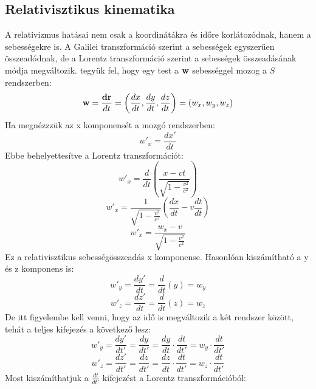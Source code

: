 \documentclass[a4paper,12pt]{article}
\begin{document}
\subsection{Relativisztikus kinematika}
A relativizmus hatásai nem csak a koordinátákra és időre korlátozódnak, hanem a sebességekre is. A Galilei transzformáció szerint a sebességek egyszerűen összeadódnak, de a Lorentz transzformáció szerint a sebességek összeadásának módja megváltozik.
tegyük fel, hogy egy test a $\bold{w}$ sebességgel mozog a $S$ rendszerben:
\begin{equation}
    \bold{w} = \frac{\bold{dr}}{dt} = \left(\frac{dx}{dt}, \frac{dy}{dt}, \frac{dz}{dt}\right) = (w_x, w_y, w_z)
\end{equation}
Ha megnézzzük az x komponensét a mozgó rendszerben:
\begin{equation}
    w'_x = \frac{dx'}{dt}
\end{equation}
Ebbe behelyettesítve a Lorentz transzformációt:
\begin{equation}
    w'_x = \frac{d}{dt} \left(\frac{x - vt}{\sqrt{1 - \frac{v^2}{c^2}}}\right)
\end{equation}
\begin{equation}
    w'_x = \frac{1}{\sqrt{1 - \frac{v^2}{c^2}}} \left(\frac{dx}{dt} - v\frac{dt}{dt}\right)
\end{equation}
\begin{equation}
    w'_x = \frac{w_x - v}{\sqrt{1 - \frac{v^2}{c^2}}}
\end{equation}
Ez a relativisztikus sebességösszeadás x komponense. Hasonlóan kiszámítható a y és z komponens is:
\begin{equation}
    w'_y = \frac{dy'}{dt} = \frac{d}{dt} (y) = w_y
\end{equation}
\begin{equation}
    w'_z = \frac{dz'}{dt} = \frac{d}{dt} (z) = w_z
\end{equation}
De itt figyelembe kell venni, hogy az idő is megváltozik a két rendszer között, tehát a teljes kifejezés a következő lesz:
\begin{equation}
    w'_y = \frac{dy'}{dt'} = \frac{dy}{dt'} = \frac{dy}{dt} \cdot \frac{dt}{dt'} = w_y \cdot \frac{dt}{dt'}
\end{equation}
\begin{equation}
    w'_z = \frac{dz'}{dt'} = \frac{dz}{dt'} = \frac{dz}{dt} \cdot \frac{dt}{dt'} = w_z \cdot \frac{dt}{dt'}
\end{equation}
Most kiszámíthatjuk a $\frac{dt}{dt'}$ kifejezést a Lorentz transzformációból:
\end{document}
